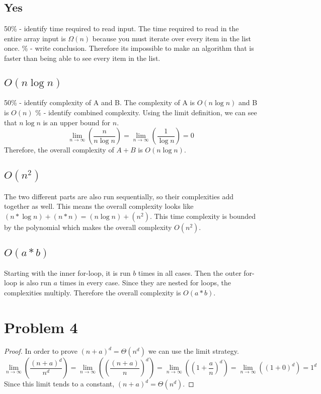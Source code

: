 \documentclass[11pt]{article}
\begin{document}
\subsection{Yes}
50\% - identify time required to read input. \newline
The time required to read in the entire array input is $\Omega{(n)}$ because you must iterate over
every item in the list once.
\% - write conclusion. \newline
Therefore its impossible to make an algorithm that is faster than being able to see every item in the list.

\subsection{$O(n\log{n})$}
50\% - identify complexity of A and B. \newline
The complexity of A is $O(n\log{n})$ and B is $O(n)$
\% - identify combined complexity. \newline
Using the limit definition, we can see that $n\log{n}$ is an upper bound
for $n$.
\begin{equation*}
    \lim _{n\to \infty }(\frac{n}{n\log{n}})=
    \lim _{n\to \infty }(\frac{1}{\log{n}})=
    0
\end{equation*}
Therefore, the overall complexity of $A + B$ is $O(n\log{n})$.

\subsection{$O(n^{2})$}
The two different parts are also run sequentially, so their complexities add together as well. This means the overall
complexity looks like $(n * \log{n}) + (n * n) = (n\log{n}) + (n^{2})$. This time complexity is bounded by the polynomial
which makes the overall complexity $O(n^{2})$.

\subsection{$O(a * b)$}
Starting with the inner for-loop, it is run $b$ times in all cases. Then the outer for-loop is also run
$a$ times in every case. Since they are nested for loops, the complexities multiply. Therefore the overall
complexity is $O(a * b)$.

\section{Problem 4}
\begin{proof} In order to prove $(n + a)^{d} = \Theta{(n^{d})}$
we can use the limit strategy.
\begin{equation*}
    \lim _{n\to \infty }(\frac{(n+a)^{d}}{n^d})=
    \lim _{n\to \infty }((\frac{(n+a)}{n})^d)=
    \lim _{n\to \infty }((1 + \frac{a}{n})^d)=
    \lim _{n\to \infty }((1 + 0)^d)=
    1^d
\end{equation*}
Since this limit tends to a constant, $(n + a)^{d} = \Theta{(n^{d})}$.
\end{proof}
\end{document}
